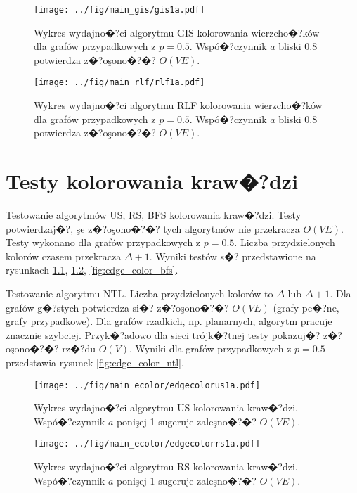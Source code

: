 \documentclass[12pt,a4paper]{mwrep}
\begin{document}
\begin{figure}
\centering
\texttt{[image: ../fig/main\_gis/gis1a.pdf]}
\caption[Wydajno�?�? algorytmu GIS kolorowania wierzcho�?ków.]{
\label{fig:nodecolorgis}
Wykres wydajno�?ci algorytmu GIS kolorowania wierzcho�?ków
dla grafów przypadkowych z $p=0.5$.
Wspó�?czynnik $a$ bliski 0.8 potwierdza z�?oşono�?�? $O(V E)$.}
\end{figure}


\begin{figure}
\centering
\texttt{[image: ../fig/main\_rlf/rlf1a.pdf]}
\caption[Wydajno�?�? algorytmu RLF kolorowania wierzcho�?ków.]{
\label{fig:nodecolorrlf}
Wykres wydajno�?ci algorytmu RLF kolorowania wierzcho�?ków
dla grafów przypadkowych z $p=0.5$.
Wspó�?czynnik $a$ bliski 0.8 potwierdza z�?oşono�?�? $O(V E)$.}
\end{figure}



\chapter{Testy kolorowania kraw�?dzi}
\label{app:test_edge_coloring}

Testowanie algorytmów US, RS, BFS kolorowania kraw�?dzi.
Testy potwierdzaj�?, şe z�?oşono�?�? tych algorytmów nie przekracza $O(V E)$.
Testy wykonano dla grafów przypadkowych z $p=0.5$.
Liczba przydzielonych kolorów czasem przekracza $\Delta + 1$.
Wyniki testów s�? przedstawione na rysunkach 
\ref{fig:edge_color_us},
\ref{fig:edge_color_rs},
\ref{fig:edge_color_bfs}.

Testowanie algorytmu NTL.
Liczba przydzielonych kolorów to $\Delta$ lub $\Delta + 1$.
Dla grafów g�?stych potwierdza si�? z�?oşono�?�? $O(V E)$
(grafy pe�?ne, grafy przypadkowe).
Dla grafów rzadkich, np. planarnych, algorytm pracuje znacznie szybciej.
Przyk�?adowo dla sieci trójk�?tnej testy pokazuj�? z�?oşono�?�? rz�?du $O(V)$.
Wyniki dla grafów przypadkowych z $p=0.5$ przedstawia rysunek
\ref{fig:edge_color_ntl}.

\begin{figure}
\centering
\texttt{[image: ../fig/main\_ecolor/edgecolorus1a.pdf]}
\caption[Wydajno�?�? algorytmu US kolorowania kraw�?dzi.]{
\label{fig:edge_color_us}
Wykres wydajno�?ci algorytmu US kolorowania kraw�?dzi.
Wspó�?czynnik $a$ ponişej 1 sugeruje zaleşno�?�? $O(V E)$.}
\end{figure}

\begin{figure}
\centering
\texttt{[image: ../fig/main\_ecolor/edgecolorrs1a.pdf]}
\caption[Wydajno�?�? algorytmu RS kolorowania kraw�?dzi.]{
\label{fig:edge_color_rs}
Wykres wydajno�?ci algorytmu RS kolorowania kraw�?dzi.
Wspó�?czynnik $a$ ponişej 1 sugeruje zaleşno�?�? $O(V E)$.}
\end{figure}
\end{document}
